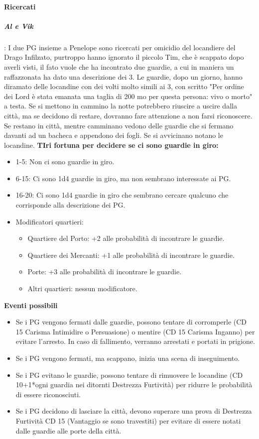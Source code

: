 \documentclass{article}
\begin{document}
\paragraph{Ricercati} 
\subparagraph{Al e Vik }:
    I due PG insieme a Penelope sono ricercati per omicidio del locandiere del Drago Infilzato, purtroppo hanno ignorato il piccolo Tim, che è scappato dopo averli visti, il fato vuole che ha incontrato due guardie, a cui in maniera un raffazzonata ha dato una descrizione dei 3. Le guardie, dopo un giorno, hanno diramato delle locandine con dei volti molto simili ai 3, con scritto "Per ordine dei Lord è stata emanata una taglia di 200 mo per questa persona: vivo o morto" a testa.
    Se si mettono in cammino la notte potrebbero riuscire a uscire dalla città, ma se decidono di restare, dovranno fare attenzione a non farsi riconoscere.
    Se restano in città, mentre camminano vedono delle guardie che si fermano davanti ad un bacheca e appendono dei fogli. Se si avvicinano notano le locandine. 
    \textbf{TIri fortuna per decidere se ci sono guardie in giro:}
    \begin{itemize} 
        \item 1-5: Non ci sono guardie in giro.
        \item 6-15: Ci sono 1d4 guardie in giro, ma non sembrano interessate ai PG.
        \item 16-20: Ci sono 1d4 guardie in giro che sembrano cercare qualcuno che corrisponde alla descrizione dei PG. 
        \item Modificatori quartieri:
        \begin{itemize}
            \item Quartiere del Porto: +2 alle probabilità di incontrare le guardie.
            \item Quartiere dei Mercanti: +1 alle probabilità di incontrare le guardie.
            \item Porte: +3 alle probabilità di incontrare le guardie.
            \item Altri quartieri: nessun modificatore.
    \end{itemize}
    \end{itemize}
    \textbf{Eventi possibili}
    \begin{itemize}
        \item Se i PG vengono fermati dalle guardie, possono tentare di corromperle (CD 15 Carisma Intimidire o Persuasione) o mentire (CD 15 Carisma Inganno) per evitare l'arresto. In caso di fallimento, verranno arrestati e portati in prigione.
        \item Se i PG vengono fermati, ma scappano, inizia una scena di inseguimento.
        \item Se i PG evitano le guardie, possono tentare di rimuovere le locandine (CD 10+1*ogni guardia nei ditornti Destrezza Furtività) per ridurre le probabilità di essere riconosciuti.
        \item Se i PG decidono di lasciare la città, devono superare una prova di Destrezza Furtività CD 15 (Vantaggio se sono travestiti) per evitare di essere notati dalle guardie alle porte della città.
    \end{itemize}
\end{document}
